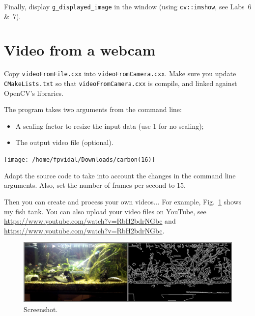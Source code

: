 \documentclass[english,a4paper,12pt,oneside]{article}
\begin{document}
Finally, display \verb+g_displayed_image+ in the window (using \verb=cv::imshow=, see Labs~6 \&~7).




\section{Video from a webcam}

Copy \verb+videoFromFile.cxx+ into \verb+videoFromCamera.cxx+. 
Make sure you update \verb+CMakeLists.txt+ so that \verb+videoFromCamera.cxx+ is compile, and linked against OpenCV's libraries.

The program takes two arguments from the command line:
\begin{itemize}
  \item A scaling factor to resize the input data (use 1 for no scaling);
  \item The output video file (optional).
\end{itemize}

\begin{center}
\texttt{[image: /home/fpvidal/Downloads/carbon(16)]}
\end{center}

Adapt the source code to take into account the changes in the command line arguments.
Also, set the number of frames per second to 15. 

Then you can create and process your own videos...
For example, Fig.~\ref{fig:screenshot2} shows my fish tank. You can also upload your video files on YouTube, see \url{https://www.youtube.com/watch?v=RbH2bdrNGbc} and \url{https://www.youtube.com/watch?v=RbH2bdrNGbc}.

 \begin{figure}[htbp]
  \centering
  \includegraphics[width=\linewidth]{screenshot2}
  \caption{\label{fig:screenshot2}Screenshot.}
 \end{figure}



%



\end{document}
